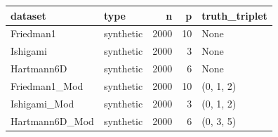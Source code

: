 \begin{tabular}{llrrl}
\toprule
dataset & type & n & p & truth_triplet \\
\midrule
Friedman1 & synthetic & 2000 & 10 & None \\
Ishigami & synthetic & 2000 & 3 & None \\
Hartmann6D & synthetic & 2000 & 6 & None \\
Friedman1_Mod & synthetic & 2000 & 10 & (0, 1, 2) \\
Ishigami_Mod & synthetic & 2000 & 3 & (0, 1, 2) \\
Hartmann6D_Mod & synthetic & 2000 & 6 & (0, 3, 5) \\
\bottomrule
\end{tabular}
